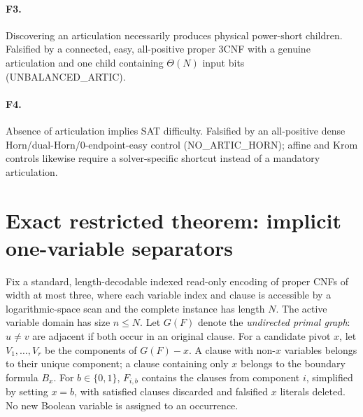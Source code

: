 \documentclass[11pt]{article}
\begin{document}
\paragraph{F3.} Discovering an articulation necessarily produces physical power-short children. Falsified by a connected, easy, all-positive proper 3CNF with a genuine articulation and one child containing $\Theta(N)$ input bits (UNBALANCED\_ARTIC).
\paragraph{F4.} Absence of articulation implies SAT difficulty. Falsified by an all-positive dense Horn/dual-Horn/0-endpoint-easy control (NO\_ARTIC\_HORN); affine and Krom controls likewise require a solver-specific shortcut instead of a mandatory articulation.

\section{Exact restricted theorem: implicit one-variable separators}
Fix a standard, length-decodable indexed read-only encoding of proper CNFs of width at most three, where each variable index and clause is accessible by a logarithmic-space scan and the complete instance has length $N$. The active variable domain has size $n\le N$. Let $G(F)$ denote the \emph{undirected primal graph}: $u\ne v$ are adjacent if both occur in an original clause. For a candidate pivot $x$, let $V_1,\ldots,V_r$ be the components of $G(F)-x$. A clause with non-$x$ variables belongs to their unique component; a clause containing only $x$ belongs to the boundary formula $B_x$. For $b\in\{0,1\}$, $F_{i,b}$ contains the clauses from component $i$, simplified by setting $x=b$, with satisfied clauses discarded and falsified $x$ literals deleted. No new Boolean variable is assigned to an occurrence.
\end{document}
